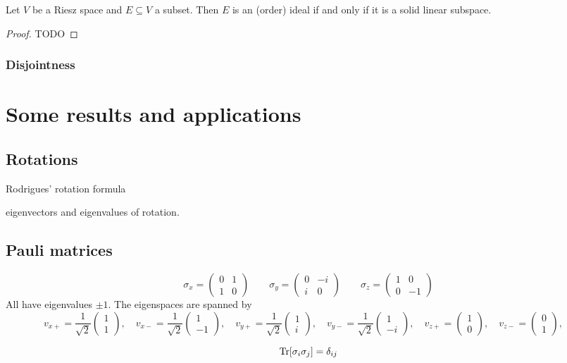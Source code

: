 \begin{lemma}
Let $V$ be a Riesz space and $E\subseteq V$ a subset. Then $E$ is an (order) ideal \textup{if and only if} it is a solid linear subspace.
\end{lemma}
\begin{proof}
TODO
\end{proof}



\subsection{Disjointness}

\chapter{Some results and applications}
\section{Rotations}
Rodrigues' rotation formula

eigenvectors and eigenvalues of rotation.
\section{Pauli matrices}

\[ \sigma_x = \begin{pmatrix}
0 & 1 \\ 1 & 0
\end{pmatrix} \qquad \sigma_y = \begin{pmatrix}
0 & -i \\ i & 0
\end{pmatrix} \qquad \sigma_z = \begin{pmatrix}
1 & 0 \\ 0 & -1
\end{pmatrix} \]
All have eigenvalues $\pm 1$. The eigenspaces are spanned by
\[ v_{x+} = \frac{1}{\sqrt{2}}\begin{pmatrix}
1 \\ 1
\end{pmatrix}, \quad v_{x-} = \frac{1}{\sqrt{2}}\begin{pmatrix}
1 \\ -1
\end{pmatrix}, \quad v_{y+} = \frac{1}{\sqrt{2}}\begin{pmatrix}
1 \\ i
\end{pmatrix}, \quad v_{y-} = \frac{1}{\sqrt{2}}\begin{pmatrix}
1 \\ -i
\end{pmatrix}, \quad v_{z+} = \begin{pmatrix}
1 \\ 0
\end{pmatrix}, \quad v_{z-} = \begin{pmatrix}
0 \\ 1
\end{pmatrix}, \quad  \]

\[ \operatorname{Tr}[\sigma_i \sigma_j] = \delta_{ij} \]

